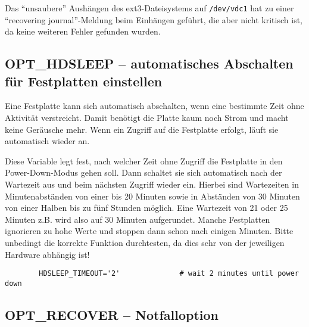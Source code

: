     Das ``unsaubere'' Aushängen des ext3-Dateisystems auf \texttt{/dev/vdc1}
    hat zu einer ``recovering journal''-Meldung beim Einhängen geführt, die
    aber nicht kritisch ist, da keine weiteren Fehler gefunden wurden.

\subsection {OPT\_HDSLEEP -- automatisches Abschalten für Festplatten einstellen}

    Eine Festplatte kann sich automatisch abschalten, wenn eine bestimmte
    Zeit ohne Aktivität verstreicht. Damit benötigt die Platte kaum noch Strom
    und macht keine Geräusche mehr. Wenn ein Zugriff auf die Festplatte
    erfolgt, läuft sie automatisch wieder an.


\begin{description}

        Diese Variable legt fest, nach welcher Zeit ohne Zugriff die 
        Festplatte in den Power-Down-Modus gehen soll. Dann schaltet sie sich 
        automatisch nach der Wartezeit aus und beim nächsten Zugriff wieder ein.
        Hierbei sind Wartezeiten in Minutenabständen von einer bis 20 Minuten 
        sowie in Abständen von 30 Minuten von einer Halben bis zu fünf
        Stunden möglich. Eine Wartezeit von 21 oder 25 Minuten z.B. wird also 
        auf 30 Minuten aufgerundet.
        Manche Festplatten ignorieren zu hohe Werte und stoppen dann schon 
        nach einigen Minuten. Bitte unbedingt die korrekte Funktion durchtesten,
        da dies sehr von der jeweiligen Hardware abhängig ist!

\begin{example}
\begin{verbatim}
        HDSLEEP_TIMEOUT='2'              # wait 2 minutes until power down
\end{verbatim}
\end{example}

\end{description}

\subsection {OPT\_RECOVER -- Notfalloption}

